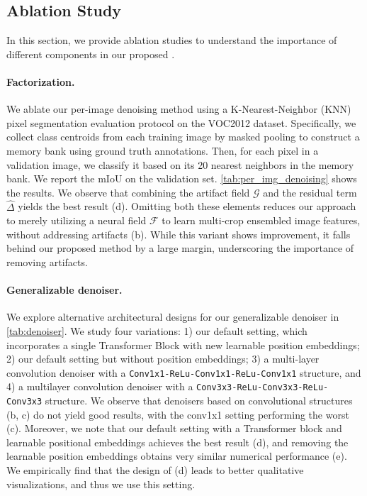 \subsection{Ablation Study}
In this section, we provide ablation studies to understand the importance of different components in our proposed \ours.

\paragraph{Factorization.} We ablate our per-image denoising method using a K-Nearest-Neighbor (KNN) pixel segmentation evaluation protocol on the VOC2012 dataset. Specifically, we collect class centroids from each training image by masked pooling to construct a memory bank using ground truth annotations. Then, for each pixel in a validation image, we classify it based on its 20 nearest neighbors in the memory bank. We report the mIoU on the validation set. \cref{tab:per_img_denoising} shows the results. We observe that combining the artifact field $\mathcal{G}$ and the residual term $\hat{\Delta}$ yields the best result (d). Omitting both these elements reduces our approach to merely utilizing a neural field $\mathcal{F}$ to learn multi-crop ensembled image features, without addressing artifacts (b). While this variant shows improvement, it falls behind our proposed method by a large margin, underscoring the importance of removing artifacts.

\paragraph{Generalizable denoiser.} We explore alternative architectural designs for our generalizable denoiser in \cref{tab:denoiser}. We study four variations: 1) our default setting, which incorporates a single Transformer Block with new learnable position embeddings; 2) our default setting but without position embeddings; 3) a multi-layer convolution denoiser with a \texttt{Conv1x1-ReLu-Conv1x1-ReLu-Conv1x1} structure, and 4) a multilayer convolution denoiser with a \texttt{Conv3x3-ReLu-Conv3x3-ReLu-Conv3x3} structure. We observe that denoisers based on convolutional structures (b, c) do not yield good results, with the conv1x1 setting performing the worst (c).
Moreover, we note that our default setting with a Transformer block and learnable positional embeddings achieves the best result (d), and removing the learnable position embeddings obtains very similar numerical performance (e). We empirically find that the design of (d) leads to better qualitative visualizations, and thus we use this setting.


